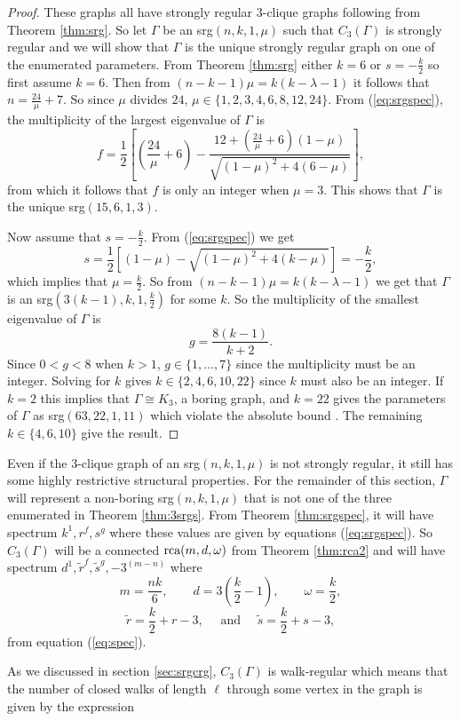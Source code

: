 \documentclass[12pt]{report}
\theoremstyle{definition}
\def\rca{{\textnormal{rca}}}
\def\r{{\tilde{r}}}
\def\s{{\tilde{s}}}
\begin{document}
 \begin{proof}
     These graphs all have strongly regular $3$-clique graphs following from Theorem \ref{thm:srg}. So let $\Gamma$ be an srg$(n,k,1,\mu)$ such that $C_3(\Gamma)$ is strongly regular and we will show that $\Gamma$ is the unique strongly regular graph on one of the enumerated parameters. From Theorem \ref{thm:srg} either $k=6$ or $s=-\frac{k}{2}$ so first assume $k=6$. Then from $(n-k-1)\mu=k(k-\lambda-1)$ it follows that $n=\frac{24}{\mu}+7$. So since $\mu$ divides $24$, $\mu \in \{1, 2, 3, 4, 6, 8, 12, 24\}$. From (\ref{eq:srgspec}), the multiplicity of the largest eigenvalue of $\Gamma$ is \[f = \frac{1}{2}\left[\left(\frac{24}{\mu}+6\right)-\frac{12 + (\frac{24}{\mu}+6)(1-\mu)}{\sqrt{(1 - \mu)^2+4(6-\mu)}}\right],\] from which it follows that $f$ is only an integer when $\mu =3$. This shows that $\Gamma$ is the unique srg$(15,6,1,3)$.\par
     Now assume that $s=-\frac{k}{2}$. From (\ref{eq:srgspec}) we get
     \[s = \frac{1}{2}\left[(1 - \mu) - \sqrt{(1 - \mu)^2+4(k-\mu)}\right] = -\frac{k}{2},\] which implies that $\mu = \frac{k}{2}$. So from $(n-k-1)\mu=k(k-\lambda-1)$ we get that $\Gamma$ is an srg$(3(k-1), k, 1, \frac{k}{2})$ for some $k$. So the multiplicity of the smallest eigenvalue of $\Gamma$ is
     \[g = \frac{8(k-1)}{k+2}.\] Since $0<g<8$ when $k >1$,  $g \in \{1, \ldots, 7\}$ since the multiplicity must be an integer. Solving for $k$ gives $k\in \{2, 4, 6, 10, 22\}$ since $k$ must also be an integer. If $k=2$ this implies that $\Gamma \cong K_3$, a boring graph, and $k=22$ gives the parameters of $\Gamma$ as srg$(63, 22, 1, 11)$ which violate the absolute bound \cite{brouwer}. The remaining  $k\in \{4,6,10\}$ give the result.
 \end{proof}
Even if the 3-clique graph of an srg$(n,k,1,\mu)$ is not strongly regular, it still has some highly restrictive structural properties. For the remainder of this section, $\Gamma$ will represent a non-boring srg$(n,k,1,\mu)$ that is not one of the three enumerated in Theorem \ref{thm:3srgs}. From Theorem \ref{thm:srgspec}, it will have spectrum $k^1,r^f,s^g$ where these values are given by equations (\ref{eq:srgspec}). So $C_3(\Gamma)$ will be a connected $\rca(m,d,\omega)$ from Theorem \ref{thm:rca2} and will have spectrum $d^1,\r^f,\s^g,-3^{(m-n)}$ where 
\[m=\frac{nk}{6}, \quad \quad
    d = 3\left(\frac{k}{2}-1\right), \quad \quad
    \omega = \frac{k}{2},\]
\[\r=\frac{k}{2}+r-3, \quad \text{ and } \quad \s=\frac{k}{2}+s-3,\] from equation (\ref{eq:spec}).\par As we discussed in section \ref{sec:srgcrg}, $C_3(\Gamma)$ is walk-regular which means that the number of closed walks of length $\ell$ through some vertex in the graph is given by the expression 
\end{document}
